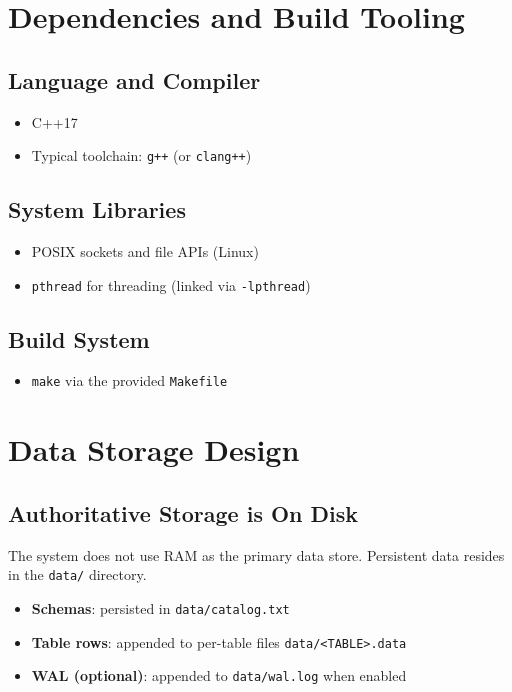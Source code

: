 \documentclass[11pt]{article}
\begin{document}
\section{Dependencies and Build Tooling}
\subsection{Language and Compiler}
\begin{itemize}[leftmargin=*]
\item C++17
\item Typical toolchain: \texttt{g++} (or \texttt{clang++})
\end{itemize}

\subsection{System Libraries}
\begin{itemize}[leftmargin=*]
\item POSIX sockets and file APIs (Linux)
\item \texttt{pthread} for threading (linked via \texttt{-lpthread})
\end{itemize}

\subsection{Build System}
\begin{itemize}[leftmargin=*]
\item \texttt{make} via the provided \texttt{Makefile}
\end{itemize}

\section{Data Storage Design}
\subsection{Authoritative Storage is On Disk}
The system does not use RAM as the primary data store. Persistent data resides in the \texttt{data/} directory.

\begin{itemize}[leftmargin=*]
\item \textbf{Schemas}: persisted in \texttt{data/catalog.txt}
\item \textbf{Table rows}: appended to per-table files \texttt{data/<TABLE>.data}
\item \textbf{WAL (optional)}: appended to \texttt{data/wal.log} when enabled
\end{itemize}
\end{document}
